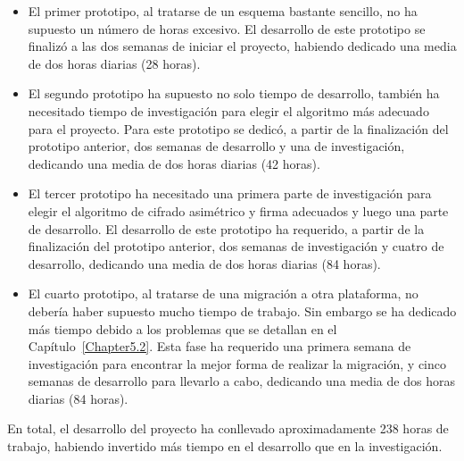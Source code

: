 \begin{itemize}
  \item El primer prototipo, al tratarse de un esquema bastante sencillo, no ha supuesto un número de horas excesivo. El desarrollo de este prototipo se finalizó a las dos semanas de iniciar el proyecto, habiendo dedicado una media de dos horas diarias (28 horas).

  \item El segundo prototipo ha supuesto no solo tiempo de desarrollo, también ha necesitado tiempo de investigación para elegir el algoritmo más adecuado para el proyecto. Para este prototipo se dedicó, a partir de la finalización del prototipo anterior, dos semanas de desarrollo y una de investigación, dedicando una media de dos horas diarias (42 horas).

  \item El tercer prototipo ha necesitado una primera parte de investigación para elegir el algoritmo de cifrado asimétrico y firma adecuados y luego una parte de desarrollo. El desarrollo de este prototipo ha requerido, a partir de la finalización del prototipo anterior, dos semanas de investigación y cuatro de desarrollo, dedicando una media de dos horas diarias (84 horas).

  \item El cuarto prototipo, al tratarse de una migración a otra plataforma, no debería haber supuesto mucho tiempo de trabajo. Sin embargo se ha dedicado más tiempo debido a los problemas que se detallan en el Capítulo~\ref{Chapter5.2}. Esta fase ha requerido una primera semana de investigación para encontrar la mejor forma de realizar la migración, y cinco semanas de desarrollo para llevarlo a cabo, dedicando una media de dos horas diarias (84 horas).
\end{itemize}

En total, el desarrollo del proyecto ha conllevado aproximadamente 238 horas de trabajo, habiendo invertido más tiempo en el desarrollo que en la investigación.
